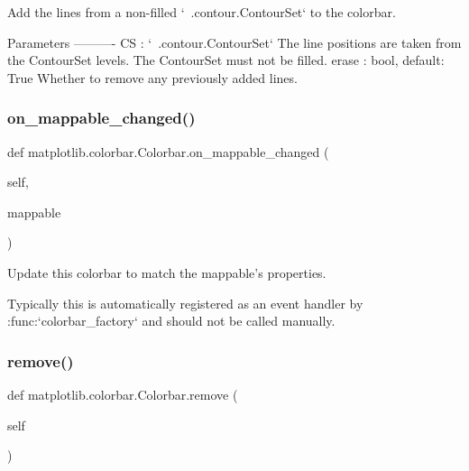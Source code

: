 \begin{DoxyVerb}Add the lines from a non-filled `~.contour.ContourSet` to the colorbar.

Parameters
----------
CS : `~.contour.ContourSet`
    The line positions are taken from the ContourSet levels. The
    ContourSet must not be filled.
erase : bool, default: True
    Whether to remove any previously added lines.
\end{DoxyVerb}
 \mbox{\label{classmatplotlib_1_1colorbar_1_1Colorbar_afa4380dbd203cb46dd4ddd7d7efaa33b}} 
\subsubsection{\texorpdfstring{on\+\_\+mappable\+\_\+changed()}{on\_mappable\_changed()}}
{\footnotesize\ttfamily def matplotlib.\+colorbar.\+Colorbar.\+on\+\_\+mappable\+\_\+changed (\begin{DoxyParamCaption}\item[{}]{self,  }\item[{}]{mappable }\end{DoxyParamCaption})}

\begin{DoxyVerb}Update this colorbar to match the mappable's properties.

Typically this is automatically registered as an event handler
by :func:`colorbar_factory` and should not be called manually.
\end{DoxyVerb}
 \mbox{\label{classmatplotlib_1_1colorbar_1_1Colorbar_a342afe263299dd1a2a682fbf7ed1df2c}} 
\subsubsection{\texorpdfstring{remove()}{remove()}}
{\footnotesize\ttfamily def matplotlib.\+colorbar.\+Colorbar.\+remove (\begin{DoxyParamCaption}\item[{}]{self }\end{DoxyParamCaption})}

